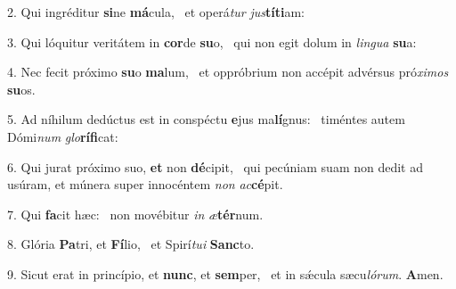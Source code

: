 2. Qui ingréditur \textbf{si}ne \textbf{má}cula, \ast\  et operá\textit{tur} \textit{jus}\textbf{tí}\textbf{ti}am:\

3. Qui lóquitur veritátem in \textbf{cor}de \textbf{su}o, \ast\  qui non egit dolum in \textit{lin}\textit{gua} \textbf{su}a:\

4. Nec fecit próximo \textbf{su}o \textbf{ma}lum, \ast\  et oppróbrium non accépit advérsus pró\textit{xi}\textit{mos} \textbf{su}os.\

5. Ad níhilum dedúctus est in conspéctu \textbf{e}jus ma\textbf{lí}gnus: \ast\  timéntes autem Dómi\textit{num} \textit{glo}\textbf{rí}\textbf{fi}cat:\

6. Qui jurat próximo suo, \textbf{et} non \textbf{dé}cipit, \ast\  qui pecúniam suam non dedit ad usúram, et múnera super innocéntem \textit{non} \textit{ac}\textbf{cé}pit.\

7. Qui \textbf{fa}cit hæc: \ast\  non movébitur \textit{in} \textit{æ}\textbf{tér}num.\

8. Glória \textbf{Pa}tri, et \textbf{Fí}lio, \ast\  et Spirí\textit{tu}\textit{i} \textbf{Sanc}to.\

9. Sicut erat in princípio, et \textbf{nunc}, et \textbf{sem}per, \ast\  et in sǽcula sæcu\textit{ló}\textit{rum}. \textbf{A}men.\

